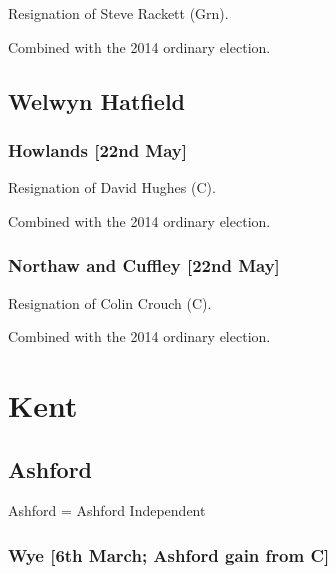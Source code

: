 \begin{resultsiii}

Resignation of Steve Rackett (Grn).

Combined with the 2014 ordinary election.

\subsection*{Welwyn Hatfield}

\subsubsection*{Howlands \hspace*{\fill}\nolinebreak[1]%
\enspace\hspace*{\fill}
[22nd May]}


Resignation of David Hughes (C).

Combined with the 2014 ordinary election.

\subsubsection*{Northaw and Cuffley \hspace*{\fill}\nolinebreak[1]%
\enspace\hspace*{\fill}
[22nd May]}


Resignation of Colin Crouch (C).

Combined with the 2014 ordinary election.

\section{Kent}

\subsection*{Ashford}

Ashford = Ashford Independent

\subsubsection*{Wye \hspace*{\fill}\nolinebreak[1]%
\enspace\hspace*{\fill}
[6th March; Ashford gain from C]}


\end{resultsiii}
